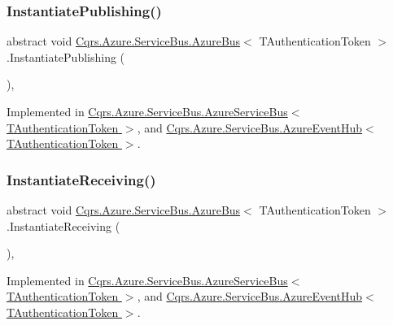 \subsubsection{\texorpdfstring{Instantiate\+Publishing()}{InstantiatePublishing()}}
{\footnotesize\ttfamily abstract void \hyperlink{classCqrs_1_1Azure_1_1ServiceBus_1_1AzureBus}{Cqrs.\+Azure.\+Service\+Bus.\+Azure\+Bus}$<$ T\+Authentication\+Token $>$.Instantiate\+Publishing (\begin{DoxyParamCaption}{ }\end{DoxyParamCaption})\hspace{0.3cm}{\ttfamily [protected]}, {}}



Implemented in \hyperlink{classCqrs_1_1Azure_1_1ServiceBus_1_1AzureServiceBus_a5c286d29b0bbfe3770f3407efda57036}{Cqrs.\+Azure.\+Service\+Bus.\+Azure\+Service\+Bus$<$ T\+Authentication\+Token $>$}, and \hyperlink{classCqrs_1_1Azure_1_1ServiceBus_1_1AzureEventHub_a3747fb9fcb3de2a72c8a6d7bbd92db95}{Cqrs.\+Azure.\+Service\+Bus.\+Azure\+Event\+Hub$<$ T\+Authentication\+Token $>$}.

\mbox{\label{classCqrs_1_1Azure_1_1ServiceBus_1_1AzureBus_ac9f66dd531dcde49be72ba8f2cb28e9b}} 
\subsubsection{\texorpdfstring{Instantiate\+Receiving()}{InstantiateReceiving()}}
{\footnotesize\ttfamily abstract void \hyperlink{classCqrs_1_1Azure_1_1ServiceBus_1_1AzureBus}{Cqrs.\+Azure.\+Service\+Bus.\+Azure\+Bus}$<$ T\+Authentication\+Token $>$.Instantiate\+Receiving (\begin{DoxyParamCaption}{ }\end{DoxyParamCaption})\hspace{0.3cm}{\ttfamily [protected]}, {}}



Implemented in \hyperlink{classCqrs_1_1Azure_1_1ServiceBus_1_1AzureServiceBus_ad49a2d063279ec98443e7f1d69178cfa}{Cqrs.\+Azure.\+Service\+Bus.\+Azure\+Service\+Bus$<$ T\+Authentication\+Token $>$}, and \hyperlink{classCqrs_1_1Azure_1_1ServiceBus_1_1AzureEventHub_aa725781eddb65bdfe456a4fecb36fb6b}{Cqrs.\+Azure.\+Service\+Bus.\+Azure\+Event\+Hub$<$ T\+Authentication\+Token $>$}.

